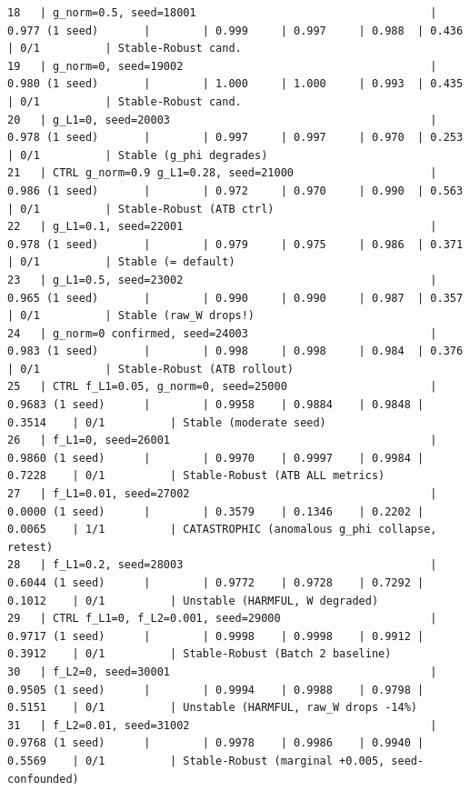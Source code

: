 \documentclass{article}
\begin{document}
\begin{tiny}
\begin{verbatim}
18   | g_norm=0.5, seed=18001                                    | 0.977 (1 seed)       |        | 0.999     | 0.997     | 0.988  | 0.436     | 0/1          | Stable-Robust cand.
19   | g_norm=0, seed=19002                                      | 0.980 (1 seed)       |        | 1.000     | 1.000     | 0.993  | 0.435     | 0/1          | Stable-Robust cand.
20   | g_L1=0, seed=20003                                        | 0.978 (1 seed)       |        | 0.997     | 0.997     | 0.970  | 0.253     | 0/1          | Stable (g_phi degrades)
21   | CTRL g_norm=0.9 g_L1=0.28, seed=21000                     | 0.986 (1 seed)       |        | 0.972     | 0.970     | 0.990  | 0.563     | 0/1          | Stable-Robust (ATB ctrl)
22   | g_L1=0.1, seed=22001                                      | 0.978 (1 seed)       |        | 0.979     | 0.975     | 0.986  | 0.371     | 0/1          | Stable (= default)
23   | g_L1=0.5, seed=23002                                      | 0.965 (1 seed)       |        | 0.990     | 0.990     | 0.987  | 0.357     | 0/1          | Stable (raw_W drops!)
24   | g_norm=0 confirmed, seed=24003                            | 0.983 (1 seed)       |        | 0.998     | 0.998     | 0.984  | 0.376     | 0/1          | Stable-Robust (ATB rollout)
25   | CTRL f_L1=0.05, g_norm=0, seed=25000                      | 0.9683 (1 seed)      |        | 0.9958    | 0.9884    | 0.9848 | 0.3514    | 0/1          | Stable (moderate seed)
26   | f_L1=0, seed=26001                                        | 0.9860 (1 seed)      |        | 0.9970    | 0.9997    | 0.9984 | 0.7228    | 0/1          | Stable-Robust (ATB ALL metrics)
27   | f_L1=0.01, seed=27002                                     | 0.0000 (1 seed)      |        | 0.3579    | 0.1346    | 0.2202 | 0.0065    | 1/1          | CATASTROPHIC (anomalous g_phi collapse, retest)
28   | f_L1=0.2, seed=28003                                      | 0.6044 (1 seed)      |        | 0.9772    | 0.9728    | 0.7292 | 0.1012    | 0/1          | Unstable (HARMFUL, W degraded)
29   | CTRL f_L1=0, f_L2=0.001, seed=29000                       | 0.9717 (1 seed)      |        | 0.9998    | 0.9998    | 0.9912 | 0.3912    | 0/1          | Stable-Robust (Batch 2 baseline)
30   | f_L2=0, seed=30001                                        | 0.9505 (1 seed)      |        | 0.9994    | 0.9988    | 0.9798 | 0.5151    | 0/1          | Unstable (HARMFUL, raw_W drops -14%)
31   | f_L2=0.01, seed=31002                                     | 0.9768 (1 seed)      |        | 0.9978    | 0.9986    | 0.9940 | 0.5569    | 0/1          | Stable-Robust (marginal +0.005, seed-confounded)

\end{verbatim}
\end{tiny}
\end{document}
